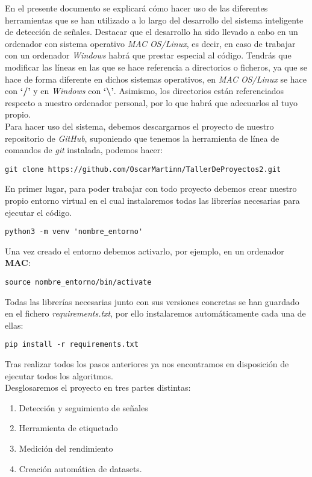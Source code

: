 En el presente documento se explicará cómo hacer uso de las diferentes herramientas que se han utilizado a lo largo del desarrollo del sistema inteligente de detección de señales. Destacar que el desarrollo ha sido llevado a cabo en un ordenador con sistema operativo \textit{MAC OS/Linux}, es decir, en caso de trabajar con un ordenador \textit{Windows} habrá que prestar especial al código. Tendrás que modificar las líneas en las que se hace referencia a directorios o ficheros, ya que se hace de forma diferente en dichos sistemas operativos, en \textit{MAC OS/Linux} se hace con \textbf{‘/’} y en \textit{Windows} con \textbf{‘\textbackslash ’}. Asimismo, los directorios están referenciados respecto a nuestro ordenador personal, por lo que habrá que adecuarlos al tuyo propio.\\

Para hacer uso del sistema, debemos descargarnos el proyecto de nuestro repositorio de \textit{GitHub}, suponiendo que tenemos la herramienta de línea de comandos de \textit{git} instalada, podemos hacer:\\

\begin{lstlisting}
git clone https://github.com/OscarMartinn/TallerDeProyectos2.git
\end{lstlisting}

En primer lugar, para poder trabajar con todo proyecto debemos crear nuestro propio entorno virtual en el cual instalaremos todas las librerías necesarias para ejecutar el código. 

\begin{lstlisting}
python3 -m venv 'nombre_entorno'
\end{lstlisting}

Una vez creado el entorno debemos activarlo, por ejemplo, en un ordenador \textbf{MAC}:

\begin{lstlisting}
source nombre_entorno/bin/activate
\end{lstlisting}

Todas las librerías necesarias junto con sus versiones concretas se han guardado en el fichero \textit{requirements.txt}, por ello instalaremos automáticamente cada una de ellas:

\begin{lstlisting}
pip install -r requirements.txt
\end{lstlisting}

Tras realizar todos los pasos anteriores ya nos encontramos en disposición de ejecutar todos los algoritmos.\\
Desglosaremos el proyecto en tres partes distintas:
\begin{enumerate}
\item Detección y seguimiento de señales
\item Herramienta de etiquetado
\item Medición del rendimiento
\item Creación automática de datasets.
\end{enumerate}

